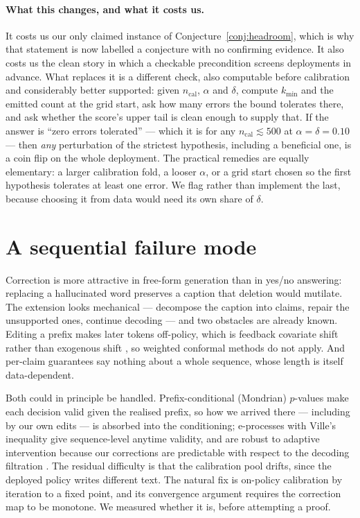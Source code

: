 \documentclass[review,number,doubleblind]{elsarticle}
\theoremstyle{plain}
\theoremstyle{definition}
\theoremstyle{remark}
\begin{document}
\paragraph{What this changes, and what it costs us.}
It costs us our only claimed instance of Conjecture~\ref{conj:headroom}, which is why that
statement is now labelled a conjecture with no confirming evidence. It also costs us the clean
story in which a checkable precondition screens deployments in advance. What replaces it is a
different check, also computable before calibration and considerably better supported: given
$n_{\mathrm{cal}}$, $\alpha$ and $\delta$, compute $k_{\min}$ and the emitted count at the grid
start, ask how many errors the bound tolerates there, and ask whether the score's upper tail is
clean enough to supply that. If the answer is ``zero errors tolerated'' --- which it is for any
$n_{\mathrm{cal}}\lesssim500$ at $\alpha=\delta=0.10$ --- then \emph{any} perturbation of the
strictest hypothesis, including a beneficial one, is a coin flip on the whole deployment. The
practical remedies are equally elementary: a larger calibration fold, a looser $\alpha$, or a
grid start chosen so the first hypothesis tolerates at least one error. We flag rather than
implement the last, because choosing it from data would need its own share of $\delta$.

\section{A sequential failure mode}
\label{sec:sequential}

Correction is more attractive in free-form generation than in yes/no answering: replacing a
hallucinated word preserves a caption that deletion would mutilate. The extension looks
mechanical --- decompose the caption into claims, repair the unsupported ones, continue
decoding --- and two obstacles are already known. Editing a prefix makes later tokens
off-policy, which is feedback covariate shift rather than exogenous shift
\citep{fannjiang2022fcs}, so weighted conformal methods \citep{tibshirani2019} do not apply.
And per-claim guarantees say nothing about a whole sequence, whose length is itself
data-dependent.

Both could in principle be handled. Prefix-conditional (Mondrian) $p$-values make each
decision valid given the realised prefix, so how we arrived there --- including by our own
edits --- is absorbed into the conditioning; e-processes with Ville's inequality give
sequence-level anytime validity, and are robust to adaptive intervention because our
corrections are predictable with respect to the decoding filtration
\citep{waudbysmith2024,ramdas2023}. The residual difficulty is that the calibration pool
drifts, since the deployed policy writes different text. The natural fix is on-policy
calibration by iteration to a fixed point, and its convergence argument requires the
correction map to be monotone. We measured whether it is, before attempting a proof.
\end{document}
